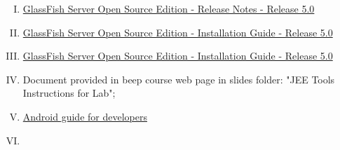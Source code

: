 \begin{enumerate}[(I)]
	\item \href{https://javaee.github.io/glassfish/doc/5.0/release-notes.pdf}{\color{blue}GlassFish Server Open Source Edition - Release Notes - Release 5.0}
	\item \href{https://javaee.github.io/glassfish/doc/5.0/installation-guide.pdf}{\color{blue}GlassFish Server Open Source Edition - Installation Guide - Release 5.0 }
	\item \href{https://javaee.github.io/glassfish/doc/5.0/installation-guide.pdf}{\color{blue}GlassFish Server Open Source Edition - Installation Guide - Release 5.0 }
	\item Document provided in beep course web page in slides folder: "JEE Tools Instructions for Lab";
	\item \href{https://developer.android.com/training/index.html}{\color{blue}Android guide for developers}
	\item {}
\end{enumerate}